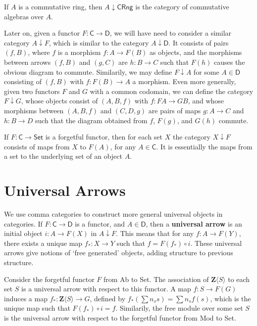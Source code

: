 \begin{example}
    If $A$ is a commutative ring, then $A \downarrow \mathsf{CRng}$ is the category of commutative algebras over $A$.
\end{example}

Later on, given a functor $F: \mathsf{C} \to \mathsf{D}$, we will have need to consider a similar category $A \downarrow F$, which is similar to the category $A \downarrow \mathsf{D}$. It consists of pairs $(f,B)$, where $f$ is a morphism $f: A \to F(B)$ as objects, and the morphisms between arrows $(f,B)$ and $(g,C)$ are $h: B \to C$ such that $F(h)$ causes the obvious diagram to commute. Similarily, we may define $F \downarrow A$ for some $A \in \mathsf{D}$ consisting of $(f,B)$ with $f: F(B) \to A$ a morphism. Even more generally, given two functors $F$ and $G$ with a common codomain, we can define the category $F \downarrow G$, whose objects consist of $(A,B,f)$ with $f: FA \to GB$, and whose morphisms between $(A,B,f)$ and $(C,D,g)$ are pairs of maps $g: A \to C$ and $h: B \to D$ such that the diagram obtained from $f$, $F(g)$, and $G(h)$ commute.

\begin{example}
    If $F: \mathsf{C} \to \mathsf{Set}$ is a forgetful functor, then for each set $X$ the category $X \downarrow F$ consists of maps from $X$ to $F(A)$, for any $A \in \mathsf{C}$. It is essentially the maps from a set to the underlying set of an object $A$.
\end{example}

\section{Universal Arrows}

We use comma categories to construct more general universal objects in categories. If $F: \mathsf{C} \to \mathsf{D}$ is a functor, and $A \in \mathsf{D}$, then a {\bf universal arrow} is an initial object $i: A \to F(X)$ in $A \downarrow F$. This means that for any $f: A \to F(Y)$, there exists a unique map $f_*: X \to Y$ such that $f = F(f_*) \circ i$. These universal arrows give notions of `free generated' objects, adding structure to previous structure.

\begin{example}
    Consider the forgetful functor $F$ from {\sf Ab} to {\sf Set}. The association of $\mathbf{Z} \langle S \rangle$ to each set $S$ is a universal arrow with respect to this functor. A map $f: S \to F(G)$ induces a map $f_*: \mathbf{Z} \langle S \rangle \to G$, defined by $f_*(\sum n_s s) = \sum n_s f(s)$, which is the unique map such that $F(f_*) \circ i = f$. Similarily, the free module over some set $S$ is the universal arrow with respect to the forgetful functor from {\sf Mod} to {\sf Set}.
\end{example}

